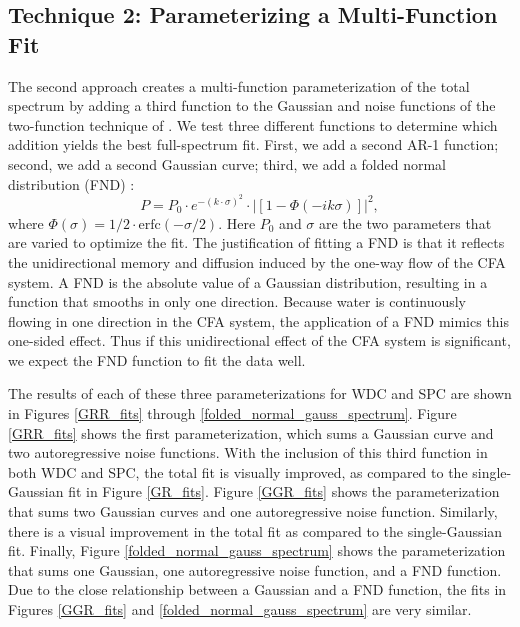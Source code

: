 \documentclass[draft, jgrga]{AGUTeX}
\begin{document}
\begin{article}
\subsection{Technique 2: Parameterizing a Multi-Function Fit}
The second approach creates a multi-function parameterization of the total spectrum by adding a third function to the Gaussian and noise functions of the two-function technique of \citet{Gkinis2014}. We test three different functions to determine which addition yields the best full-spectrum fit. First, we add a second AR-1 function; second, we add a second Gaussian curve; third, we add a folded normal distribution (FND) \citep{Tsagris2014}:
\begin{equation}
P = P_{0} \cdot e^{-(k \cdot \sigma)^2} \cdot |\left[1 - \Phi(-i k \sigma)\right]|^2,
\end{equation}
where $\Phi(\sigma) = 1/2\cdot \mathrm{erfc}(-\sigma/2) $. Here $P_0$ and $\sigma$ are the two parameters that are varied to optimize the fit. The justification of fitting a FND is that it reflects the unidirectional memory and diffusion induced by the one-way flow of the CFA system. A FND is the absolute value of a Gaussian distribution, resulting in a function that smooths in only one direction. Because water is continuously flowing in one direction in the CFA system, the application of a FND mimics this one-sided effect. Thus if this unidirectional effect of the CFA system is significant, we expect the FND function to fit the data well.

The results of each of these three parameterizations for WDC and SPC are shown in Figures \ref{GRR_fits} through \ref{folded_normal_gauss_spectrum}. Figure \ref{GRR_fits} shows the first parameterization, which sums a Gaussian curve and two autoregressive noise functions. With the inclusion of this third function in both WDC and SPC, the total fit is visually improved, as compared to the single-Gaussian fit in Figure \ref{GR_fits}. Figure \ref{GGR_fits} shows the parameterization that sums two Gaussian curves and one autoregressive noise function. Similarly, there is a visual improvement in the total fit as compared to the single-Gaussian fit. Finally, Figure \ref{folded_normal_gauss_spectrum} shows the parameterization that sums one Gaussian, one autoregressive noise function, and a FND function. Due to the close relationship between a Gaussian and a FND function, the fits in Figures \ref{GGR_fits} and \ref{folded_normal_gauss_spectrum} are very similar.



\end{article}
\end{document}
